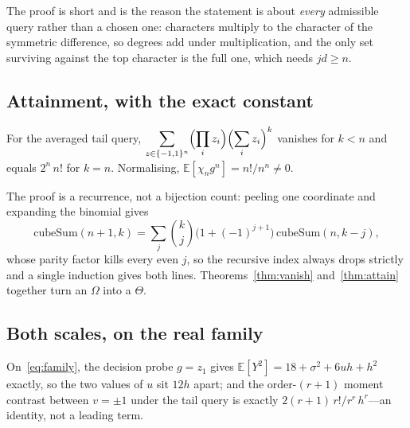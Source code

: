 
The proof is short and is the reason the statement is about \emph{every} admissible query
rather than a chosen one: characters multiply to the character of the symmetric difference,
so degrees add under multiplication, and the only set surviving against the top character is
the full one, which needs $jd\ge n$.

\subsection{Attainment, with the exact constant}

\begin{theorem}[Attainment]
\label{thm:attain}
For the averaged tail query,
$\displaystyle\sum_{z\in\{-1,1\}^{n}}\Bigl(\prod_{i}z_{i}\Bigr)\Bigl(\sum_{i}z_{i}\Bigr)^{k}$
vanishes for $k<n$ and equals $2^{n}\,n!$ for $k=n$. Normalising,
$\mathbb{E}[\chi_{n}g^{n}]=n!/n^{n}\neq0$.
\end{theorem}


The proof is a recurrence, not a bijection count: peeling one coordinate and expanding the
binomial gives
\begin{equation}
\mathrm{cubeSum}(n{+}1,k)=\sum_{j}\binom{k}{j}\bigl(1+(-1)^{j+1}\bigr)\,\mathrm{cubeSum}(n,k{-}j),
\label{eq:rec}
\end{equation}
whose parity factor kills every even $j$, so the recursive index always drops strictly and a
single induction gives both lines. Theorems~\ref{thm:vanish} and~\ref{thm:attain} together
turn an $\Omega$ into a $\Theta$.

\subsection{Both scales, on the real family}

On~\eqref{eq:family}, the decision probe $g=z_{1}$ gives
$\mathbb{E}[Y^{2}]=18+\sigma^{2}+6uh+h^{2}$ exactly, so the two values of $u$ sit $12h$
apart; and the order-$(r{+}1)$ moment contrast between $v=\pm1$ under the tail query is
exactly $2(r{+}1)\,r!/r^{r}\,h^{r}$---an identity, not a leading term. \CERT{}

